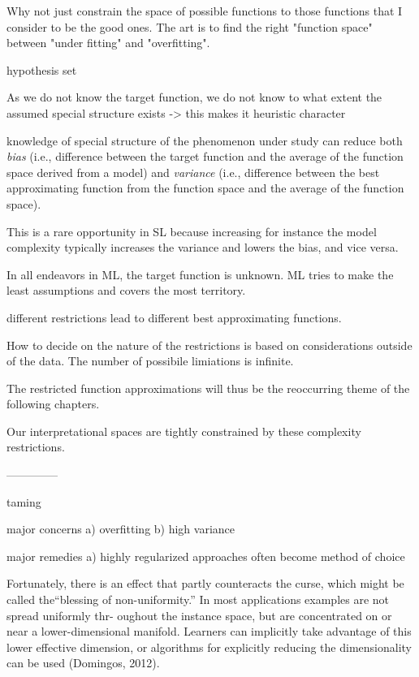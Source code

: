 \documentclass[authoryear,review,3p]{elsarticle}
\begin{document}
Why not just constrain the space of possible functions to those functions that I consider to be the good ones. The art is to find the right "function space" between "under fitting" and "overfitting".

hypothesis set



As we do not know the target function,
we do not know to what extent the assumed special structure exists
-> this makes it heuristic character


knowledge of special structure of the phenomenon under study
can reduce both \textit{bias}
(i.e., difference between the target function and
the average of the function space derived from a model)
and
\textit{variance}
(i.e., difference between the best approximating function 
from the function space and
the average of the function space).

This is a rare opportunity in SL because increasing
for instance the model complexity
typically increases the variance and lowers the bias, and vice versa.


In all endeavors in ML, the target function is unknown. 
ML tries to make the least assumptions and covers the most territory.

different restrictions lead to different
best approximating functions.

How to decide on the nature of the restrictions is based on considerations outside of the data.
The number of possibile limiations is infinite.

The restricted function approximations
will thus be the reoccurring theme of the following chapters.


Our interpretational spaces are tightly constrained by these
complexity restrictions.

--------------

taming 

major concerns
a) overfitting
b) high variance

major remedies
a) highly regularized approaches often become method of choice


Fortunately, there is an effect that partly counteracts the curse, which might be called the“blessing of non-uniformity.” In most applications examples are not spread uniformly thr- oughout the instance space, but are concentrated on or near a lower-dimensional manifold. Learners can implicitly take advantage of this lower effective dimension, or algorithms for explicitly reducing the dimensionality can be used
(Domingos, 2012).
\end{document}
